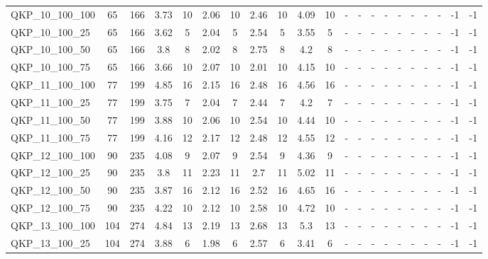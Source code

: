\begin{sidewaystable}[!ht]
{\begin{tabular}{lcccccccccccccccccccc}
QKP\_10\_100\_100 & 65 & 166 & 3.73 & 10 &  \textcolor{blue2}{2.06} & 10 & 2.46 & 10 & 4.09 & 10 &  - &  - &  - &  - &  - &  - &  - &  - & -1 & -1 \\
QKP\_10\_100\_25 & 65 & 166 & 3.62 & 5 &  \textcolor{blue2}{2.04} & 5 & 2.54 & 5 & 3.55 & 5 &  - &  - &  - &  - &  - &  - &  - &  - & -1 & -1 \\
QKP\_10\_100\_50 & 65 & 166 & 3.8 & 8 &  \textcolor{blue2}{2.02} & 8 & 2.75 & 8 & 4.2 & 8 &  - &  - &  - &  - &  - &  - &  - &  - & -1 & -1 \\
QKP\_10\_100\_75 & 65 & 166 & 3.66 & 10 & 2.07 & 10 &  \textcolor{blue2}{2.01} & 10 & 4.15 & 10 &  - &  - &  - &  - &  - &  - &  - &  - & -1 & -1 \\
QKP\_11\_100\_100 & 77 & 199 & 4.85 & 16 &  \textcolor{blue2}{2.15} & 16 & 2.48 & 16 & 4.56 & 16 &  - &  - &  - &  - &  - &  - &  - &  - & -1 & -1 \\
QKP\_11\_100\_25 & 77 & 199 & 3.75 & 7 &  \textcolor{blue2}{2.04} & 7 & 2.44 & 7 & 4.2 & 7 &  - &  - &  - &  - &  - &  - &  - &  - & -1 & -1 \\
QKP\_11\_100\_50 & 77 & 199 & 3.88 & 10 &  \textcolor{blue2}{2.06} & 10 & 2.54 & 10 & 4.44 & 10 &  - &  - &  - &  - &  - &  - &  - &  - & -1 & -1 \\
QKP\_11\_100\_75 & 77 & 199 & 4.16 & 12 &  \textcolor{blue2}{2.17} & 12 & 2.48 & 12 & 4.55 & 12 &  - &  - &  - &  - &  - &  - &  - &  - & -1 & -1 \\
QKP\_12\_100\_100 & 90 & 235 & 4.08 & 9 &  \textcolor{blue2}{2.07} & 9 & 2.54 & 9 & 4.36 & 9 &  - &  - &  - &  - &  - &  - &  - &  - & -1 & -1 \\
QKP\_12\_100\_25 & 90 & 235 & 3.8 & 11 &  \textcolor{blue2}{2.23} & 11 & 2.7 & 11 & 5.02 & 11 &  - &  - &  - &  - &  - &  - &  - &  - & -1 & -1 \\
QKP\_12\_100\_50 & 90 & 235 & 3.87 & 16 &  \textcolor{blue2}{2.12} & 16 & 2.52 & 16 & 4.65 & 16 &  - &  - &  - &  - &  - &  - &  - &  - & -1 & -1 \\
QKP\_12\_100\_75 & 90 & 235 & 4.22 & 10 &  \textcolor{blue2}{2.12} & 10 & 2.58 & 10 & 4.72 & 10 &  - &  - &  - &  - &  - &  - &  - &  - & -1 & -1 \\
QKP\_13\_100\_100 & 104 & 274 & 4.84 & 13 &  \textcolor{blue2}{2.19} & 13 & 2.68 & 13 & 5.3 & 13 &  - &  - &  - &  - &  - &  - &  - &  - & -1 & -1 \\
QKP\_13\_100\_25 & 104 & 274 & 3.88 & 6 &  \textcolor{blue2}{1.98} & 6 & 2.57 & 6 & 3.41 & 6 &  - &  - &  - &  - &  - &  - &  - &  - & -1 & -1 \\

\end{tabular}}
\end{sidewaystable}
